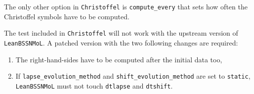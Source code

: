 The only other option in \texttt{Christoffel} is \texttt{compute_every} that
sets how often the Christoffel symbols have to be computed.

The test included in \texttt{Christoffel} will not work with the upstream
version of \texttt{LeanBSSNMoL}. A patched version with the two following
changes are required:
\begin{enumerate}
  \item The right-hand-sides have to be computed after the initial data too,
  \item If \texttt{lapse_evolution_method} and \texttt{shift_evolution_method} are
  set to \texttt{static}, \texttt{LeanBSSNMoL} must not touch \texttt{dtlapse}
  and \texttt{dtshift}.
\end{enumerate}



